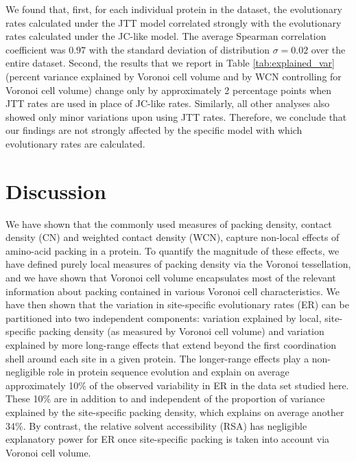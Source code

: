 \documentclass[12pt]{article}
\begin{document}
We found that, first, for each individual protein in the dataset, the evolutionary rates calculated under the JTT model correlated strongly with the evolutionary rates calculated under the JC-like model. The average Spearman correlation coefficient was $0.97$ with the standard deviation of distribution $\sigma=0.02$ over the entire dataset. Second, the results that we report in Table \ref{tab:explained_var} (percent variance explained by Voronoi cell volume and by WCN controlling for Voronoi cell volume) change only by approximately 2 percentage points when JTT rates are used in place of JC-like rates. Similarly, all other analyses also showed only minor variations upon using JTT rates. Therefore, we conclude that our findings are not strongly affected by the specific model with which evolutionary rates are calculated.


\section*{Discussion}

We have shown that the commonly used measures of packing density, contact density (CN) and weighted contact density (WCN), capture non-local effects of amino-acid packing in a protein. To quantify the magnitude of these effects, we have defined purely local measures of packing density via the Voronoi tessellation, and we have shown that Voronoi cell volume encapsulates most of the relevant information about packing contained in various Voronoi cell characteristics. We have then shown that the variation in site-specific evolutionary rates (ER) can be partitioned into two independent components: variation explained by local, site-specific packing density (as measured by Voronoi cell volume) and variation explained by more long-range effects that extend beyond the first coordination shell around each site in a given protein. The longer-range effects play a non-negligible role in protein sequence evolution and explain on average approximately 10\% of the observed variability in ER in the data set studied here. These 10\% are in addition to and independent of the proportion of variance explained by the site-specific packing density, which explains on average another 34\%. By contrast, the relative solvent accessibility (RSA) has negligible explanatory power for ER once site-specific packing is taken into account via Voronoi cell volume.
\end{document}
